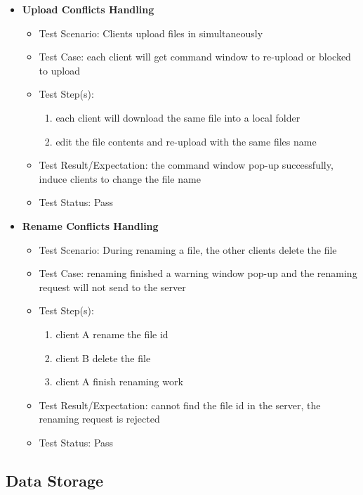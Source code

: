 \documentclass{article}
\begin{document}
\begin{itemize}
\begin{itemize}
\end{itemize}
\item\textbf{Upload Conflicts Handling}
\begin{itemize}
        \item{Test Scenario: Clients upload files in simultaneously }
        \item{Test Case: each client will get command window to re-upload or blocked to upload}
        \item{Test Step(s):}
        \begin{enumerate}
                \item{each client will download the same file into a local folder}
                \item{edit the file contents and re-upload with the same files name}
            \end{enumerate}
        \item{Test Result/Expectation: the command window pop-up successfully, induce clients to change the file name}
        \item{Test Status: Pass}
\end{itemize}
\item\textbf{Rename Conflicts Handling}
\begin{itemize}
        \item{Test Scenario: During renaming a file, the other clients delete the file}
        \item{Test Case: renaming finished a warning window pop-up and the renaming request will not send to the server}
        \item{Test Step(s):}
        \begin{enumerate}
                \item{client A rename the file id}
                \item{client B delete the file}
                \item{client A finish renaming work}
            \end{enumerate}
        \item{Test Result/Expectation: cannot find the file id in the server, the renaming request is rejected}
        \item{Test Status: Pass}
\end{itemize}

\end{itemize}
\subsection{Data Storage}
\end{document}
